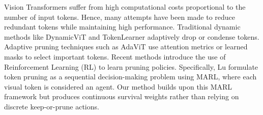 Vision Transformers suffer from high computational costs proportional to the number of input tokens. Hence, many attempts have been made to reduce redundant tokens while maintaining high performance. Traditional dynamic methods like DynamicViT \cite{rao2021dynamicvit} and TokenLearner \cite{ryoo2021tokenlearner} adaptively drop or condense tokens. Adaptive pruning techniques such as AdaViT \cite{meng2022adavit} use attention metrics or learned masks to select important tokens. Recent methods introduce the use of Reinforcement Learning (RL) to learn pruning policies. Specifically, Lu \etal \cite{lu2025reinforcement} formulate token pruning as a sequential decision-making problem using MARL, where each visual token is considered an agent. Our method builds upon this MARL framework but produces continuous survival weights rather than relying on discrete keep-or-prune actions.
